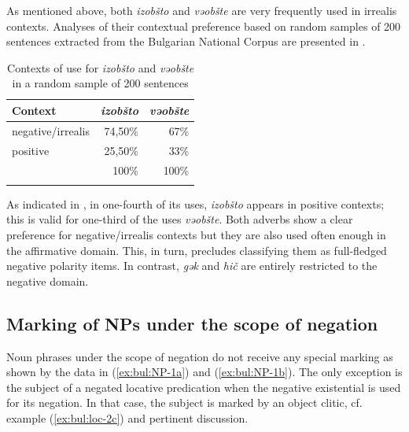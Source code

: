 \documentclass[output=paper,colorlinks=true, citecolor=brown]{langscibook}
\begin{document}
As mentioned above, both \textit{izobšto} and \textit{vəobšte}  are very frequently used in irrealis contexts. Analyses of their contextual preference based on random samples of 200 sentences extracted from the Bulgarian National Corpus are presented in .

\begin{table}
    \begin{tabular}{lrr}
        \lsptoprule
        {{Context}} & \textit{{izobšto}}& \textit{{vəobšte}}\\ 
        \midrule
        negative\slash irrealis   & 74,50\% & 67\%\\
        positive  & 25,50\% & 33\%\\
        \midrule
         & 100\% & 100\%\\
        \lspbottomrule
    \end{tabular}
    \caption{Contexts of use for \textit{izobšto} and \textit{vəobšte} in a random sample of 200 sentences}
    \label{tab:bul:izobshto}
\end{table}

As indicated in , in one-fourth of its uses, \textit{izobšto} appears in positive contexts; this is valid for one-third of the uses \textit{vəobšte}. Both adverbs show a clear preference for negative\slash irrealis contexts but they are also used often enough in the affirmative domain. This, in turn, precludes classifying them as full-fledged negative polarity items. In contrast, \textit{gək} and \textit{hič} are entirely restricted to the negative domain.

\subsection{Marking of NPs under the scope of negation} \label{sec:4.3}

Noun phrases under the scope of negation do not receive any special marking as shown by the data in (\ref{ex:bul:NP-1a}) and (\ref{ex:bul:NP-1b}). The only exception is the subject of a negated locative predication when the negative existential is used for its negation. In that case, the subject is marked by an object clitic, cf. example (\ref{ex:bul:loc-2c}) and pertinent discussion. 
\end{document}
